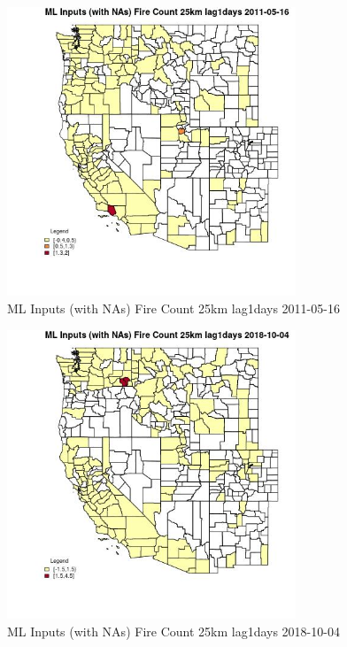 \begin{figure} 
\centering  
\includegraphics[width=0.77\textwidth]{Code_Outputs/Report_ML_input_PM25_Step4_part_f_de_duplicated_aves_prioritize_24hr_obswNAs_CountyFire_Count_25km_lag1daysMean2011-05-16.jpg} 
\caption{\label{fig:Report_ML_input_PM25_Step4_part_f_de_duplicated_aves_prioritize_24hr_obswNAsCountyFire_Count_25km_lag1daysMean2011-05-16}ML Inputs (with NAs) Fire Count 25km lag1days 2011-05-16} 
\end{figure} 
 

\begin{figure} 
\centering  
\includegraphics[width=0.77\textwidth]{Code_Outputs/Report_ML_input_PM25_Step4_part_f_de_duplicated_aves_prioritize_24hr_obswNAs_CountyFire_Count_25km_lag1daysMean2018-10-04.jpg} 
\caption{\label{fig:Report_ML_input_PM25_Step4_part_f_de_duplicated_aves_prioritize_24hr_obswNAsCountyFire_Count_25km_lag1daysMean2018-10-04}ML Inputs (with NAs) Fire Count 25km lag1days 2018-10-04} 
\end{figure} 
 

